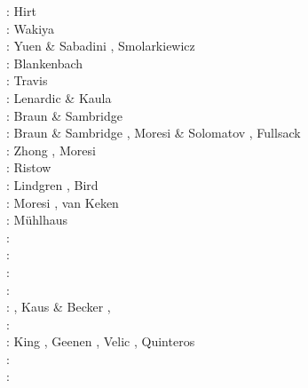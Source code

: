 \begin{scriptsize}
\nineteenseventyfour: Hirt \etal \cite{hiac74}\\
\nineteenseventyfive: Wakiya \cite{waki75a,waki75b}\\
\nineteeneightyfour: Yuen \& Sabadini \cite{yusa84}, Smolarkiewicz \cite{smol84}\\
\nineteeneightynine: Blankenbach \etal \cite{blbc89}\\
\nineteenninety: Travis \etal \cite{trab90}\\
\nineteenninetythree: Lenardic \& Kaula \cite{leka93}\\
\nineteenninetyfour: Braun \& Sambridge \cite{brsa94}\\
\nineteenninetyfive: Braun \& Sambridge \cite{brsa95}, Moresi \& Solomatov \cite{moso95}, 
                     Fullsack \cite{full95}\\
\nineteenninetysix: Zhong \cite{zhon96}, Moresi \etal \cite{mozg96}\\
\nineteenninetyseven: Ristow \cite{rist97}\\
\nineteenninetynine: Lindgren \cite{lind99}, Bird \cite{bird99}\\
\twothousandone: Moresi \etal\cite{modm01}, van Keken \cite{vank01}\\
\twothousandtwo: M{\"u}hlhaus \etal \cite{mudm02}\\
\twothousandthree: \cite{taki03}\cite{modm03}\cite{geyu03}\cite{geyu03b}\cite{taxi03}\cite{scpo03}\\
\twothousandfour: \cite{kaps04}\cite{kasa04}\cite{kaks08}\cite{mumc04}\\
\twothousandfive: \cite{mure05}\\
\twothousandsix: \cite{kapo06}\cite{more06}\cite{onmm06}\cite{mudm06}\cite{tact06}\\
\twothousandseven: \cite{toma07}\cite{chcc07}, Kaus \& Becker \cite{kabe07}, \cite{kaks07}\cite{moql07}\cite{geyu07}\cite{dadh07}
      \cite{zldf07}\\
\twothousandeight: \cite{zhmt08}\cite{deka08}\cite{trub08}\cite{krdp08}\cite{mamo08}\cite{gepd98}
      \cite{vack08}\cite{heta08}\cite{brtf08}\cite{daks08}\cite{chzy08}\cite{tack08}\cite{hust08b}\\
\twothousandnine: King \cite{king09}, Geenen \etal \cite{geum09}, Velic \etal \cite{vemm09}, 
                  Quinteros \etal \cite{qurj09}\\
\twothousandten: \cite{kaus10}\cite{kamm10}\cite{egat10}\cite{kilv10}\\
\twothousandeleven: \cite{dumg11}\cite{uibb11}\cite{hegc11}\cite{muso11}\cite{dawk11}\cite{lemm11}\\

\end{scriptsize}
